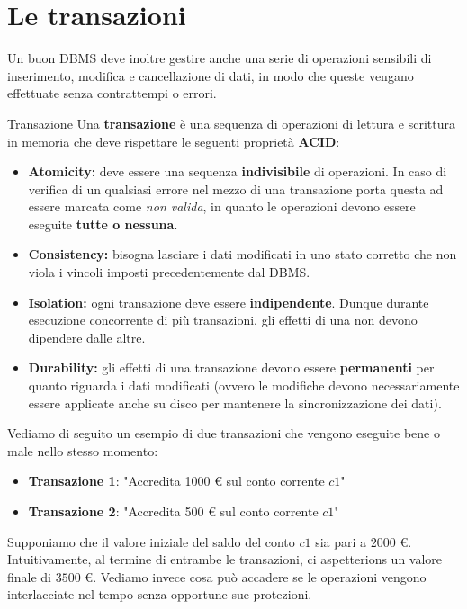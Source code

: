 \documentclass[12pt]{report}
\begin{document}
	\section{Le transazioni}
	Un buon DBMS deve inoltre gestire anche una serie di operazioni sensibili di inserimento, modifica e cancellazione di dati, in modo che queste vengano effettuate senza contrattempi o errori.
	\begin{definizione}{Transazione}{}
		Una \textbf{transazione} è una sequenza di operazioni di lettura e scrittura in memoria che deve rispettare le seguenti proprietà \textbf{ACID}:
		\begin{itemize}
			\item \textbf{Atomicity:} deve essere una sequenza \textbf{indivisibile} di operazioni. In caso di verifica di un qualsiasi errore nel mezzo di una transazione porta questa ad essere marcata come \textit{non valida}, in quanto le operazioni devono essere eseguite \textbf{tutte o nessuna}.
			
			\item \textbf{Consistency:} bisogna lasciare i dati modificati in uno stato corretto che non viola i vincoli imposti precedentemente dal DBMS.
			
			\item \textbf{Isolation:} ogni transazione deve essere \textbf{indipendente}. Dunque durante esecuzione concorrente di più transazioni, gli effetti di una non devono dipendere dalle altre.
			
			\item \textbf{Durability:} gli effetti di una transazione devono essere \textbf{permanenti} per quanto riguarda i dati modificati (ovvero le modifiche devono necessariamente essere applicate anche su disco per mantenere la sincronizzazione dei dati).
		\end{itemize}
	\end{definizione}
	
	Vediamo di seguito un esempio di due transazioni che vengono eseguite bene o male nello stesso momento:
	
	\begin{itemize}
		\item \textbf{Transazione 1}: "Accredita 1000 € sul conto corrente $c1$"
		\item \textbf{Transazione 2}: "Accredita 500 € sul conto corrente $c1$"
	\end{itemize}
	
	Supponiamo che il valore iniziale del saldo del conto $c1$ sia pari a $2000$ €. Intuitivamente, al termine di entrambe le transazioni, ci aspetterions un valore finale di $3500$ €. Vediamo invece cosa può accadere se le operazioni vengono interlacciate nel tempo senza opportune 
	sue protezioni.
	
\end{document}
